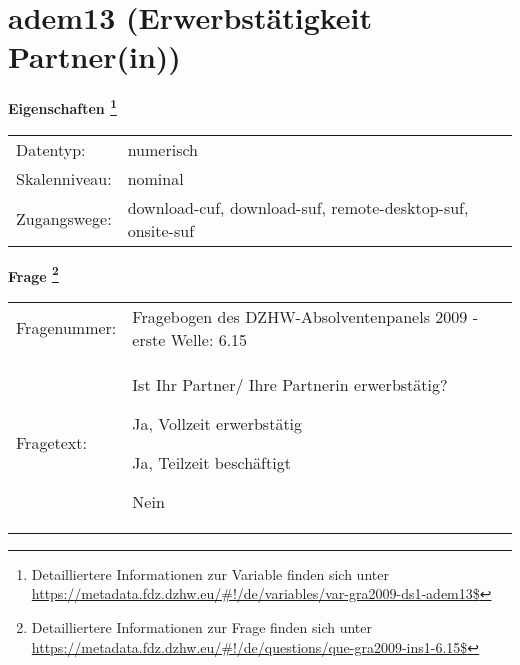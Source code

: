 
    \setcounter{footnote}{0}

    \vspace*{-1.8cm}
	\section{adem13 (Erwerbstätigkeit Partner(in))}
	\label{section:adem13}



    \vspace*{0.5cm}
    \noindent\textbf{Eigenschaften
	\footnote{Detailliertere Informationen zur Variable finden sich unter
		\url{https://metadata.fdz.dzhw.eu/\#!/de/variables/var-gra2009-ds1-adem13$}}}\\
	\begin{tabularx}{\hsize}{@{}lX}
	Datentyp: & numerisch \\
	Skalenniveau: & nominal \\
	Zugangswege: &
	  download-cuf, 
	  download-suf, 
	  remote-desktop-suf, 
	  onsite-suf
 \\
    \end{tabularx}



				\vspace*{0.5cm}
                \noindent\textbf{Frage
	                \footnote{Detailliertere Informationen zur Frage finden sich unter
		              \url{https://metadata.fdz.dzhw.eu/\#!/de/questions/que-gra2009-ins1-6.15$}}}\\
				\begin{tabularx}{\hsize}{@{}lX}
					Fragenummer: &
					  Fragebogen des DZHW-Absolventenpanels 2009 - erste Welle:
					  6.15
 \\
					Fragetext: & Ist Ihr Partner/ Ihre Partnerin erwerbstätig?\par  Ja, Vollzeit erwerbstätig\par  Ja, Teilzeit beschäftigt\par  Nein \\
				\end{tabularx}





